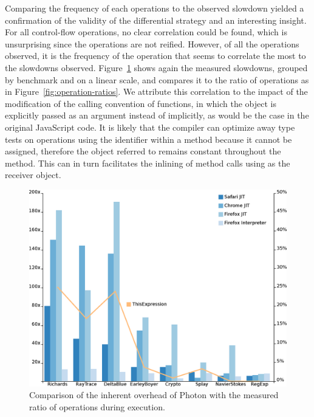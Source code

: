 Comparing the frequency of each operations to the observed slowdown yielded a
confirmation of the validity of the differential strategy and an interesting
insight. For all control-flow operations, no clear correlation could be found,
which is unsurprising since the operations are not reified. However, of all the
operations observed, it is the frequency of the  operation that seems
to correlate the most to the slowdowns observed.
Figure~\ref{fig:slowdown-vs-this-ratio} shows again the measured slowdowns,
grouped by benchmark and on a linear scale, and compares it to the ratio of
 operations as in Figure~\ref{fig:operation-ratios}.  We attribute
this correlation to the impact of the modification of the calling convention of
functions, in which the  object is explicitly passed as an argument
instead of implicitly, as would be the case in the original JavaScript code. It
is likely that the compiler can optimize away type tests on operations using
the  identifier within a method because it cannot be assigned,
therefore the object referred to remains constant throughout the method. This
can in turn facilitates the inlining of method calls using  as the
receiver object.

\begin{figure}[htbp]
\begin{center}
\includegraphics[width=.80\textwidth]{figures/slowdownVSThisRatio}
\caption[Slowdown and ratio of  operations]{Comparison of the inherent overhead of Photon with the measured ratio of  operations during execution.}
\label{fig:slowdown-vs-this-ratio}
\end{center}
\end{figure}

\FloatBarrier

